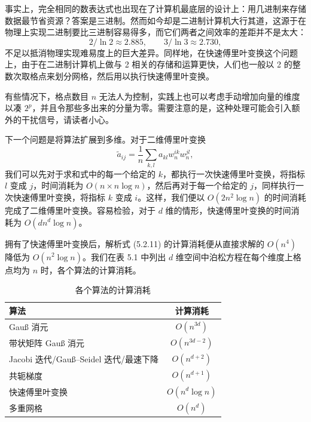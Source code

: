 事实上，完全相同的数表达式也出现在了计算机最底层的设计上：用几进制来存储数据最节省资源？答案是三进制。然而如今却是二进制计算机大行其道，这源于在物理上实现二进制要比三进制容易得多，而它们两者之间效率的差距并不是太大：
\begin{equation}
2/\ln2\approx2.885,\qquad 3/\ln3\approx2.730,
\tag{5.2.34}
\end{equation}
不足以抵消物理实现难易度上的巨大差异。同样地，在快速傅里叶变换这个问题上，由于在二进制计算机上做与 2 相关的存储和运算更快，人们也一般以 2 的整数次取格点来划分网格，然后用以执行快速傅里叶变换。

有些情况下，格点数目 $n$ 无法人为控制，实践上也可以考虑手动增加向量的维度以凑 $2^p$，并且令那些多出来的分量为零。需要注意的是，这种处理可能会引入额外的干扰信号，请读者小心。

下一个问题是将算法扩展到多维。对于二维傅里叶变换
\begin{equation}
\tilde a_{ij}=\frac1n\sum_{k,l}a_{kl}w_n^{ik}w_n^{jl},
\tag{5.2.35}
\end{equation}
我们可以先对于求和式中的每一个给定的 $k$，都执行一次快速傅里叶变换，将指标 $l$ 变成 $j$，时间消耗为 $O(n\times n\log n)$，然后再对于每一个给定的 $j$，同样执行一次快速傅里叶变换，将指标 $k$ 变成 $i$。这样，我们便以 $O(2n^2\log n)$ 的时间消耗完成了二维傅里叶变换。容易检验，对于 $d$ 维的情形，快速傅里叶变换的时间消耗为 $O(dn^d\log n)$。

拥有了快速傅里叶变换后，解析式 (5.2.11) 的计算消耗便从直接求解的 $O(n^4)$ 降低为 $O(n^2\log n)$。我们在表 5.1 中列出 $d$ 维空间中泊松方程在每个维度上格点均为 $n$ 时，各个算法的计算消耗。

\begin{table}[htbp]
\centering
\caption{各个算法的计算消耗}
\begin{tabular}{@{}lc@{}}
\toprule
算法 & 计算消耗\\
\midrule
Gauß 消元 & $O(n^{3d})$\\
带状矩阵 Gauß 消元 & $O(n^{3d-2})$\\
Jacobi 迭代/Gauß--Seidel 迭代/最速下降 & $O(n^{d+2})$\\
共轭梯度 & $O(n^{d+1})$\\
快速傅里叶变换 & $O(n^d\log n)$\\
多重网格 & $O(n^d)$\\
\bottomrule
\end{tabular}
\label{tab:complexity-poisson}
\end{table}

